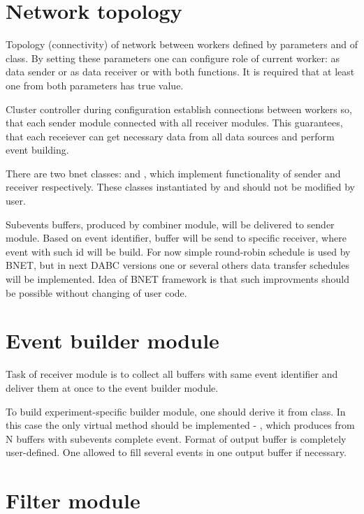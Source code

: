 \section{Network topology}

Topology (connectivity) of network between workers defined by parameters 
 and  of  class. 
By setting these parameters one can configure role of current worker:
as data sender or as data receiver or with both functions.
It is required that at least one from both parameters has true value.

Cluster controller during configuration establish connections between workers so,
that each sender module connected with all receiver modules. This guarantees, that 
each receiever can get necessary data from all data sources and perform event building.

There are two bnet classes:  and ,
which implement functionality of sender and receiver respectively. 
These classes instantiated by
 and should not be modified by user.     

Subevents buffers, produced by combiner module, will be delivered 
to sender module. Based on event identifier, buffer will be 
send to specific receiver, where event with such id will be build. 
For now simple round-robin schedule is used by BNET, but in next DABC versions
one or several others data transfer schedules will be implemented.
Idea of BNET framework is that such improvments should be possible without
changing of user code.  


\section{Event builder module}

Task of receiver module is to collect all buffers with same event identifier and
deliver them at once to the event builder module.

To build experiment-specific builder module, one should derive it from
 class. In this case the only virtual method
should be implemented - , which produces from N buffers with subevents
complete event. Format of output buffer is completely user-defined. 
One allowed to fill several events in one output buffer if necessary.    


\section{Filter module}

